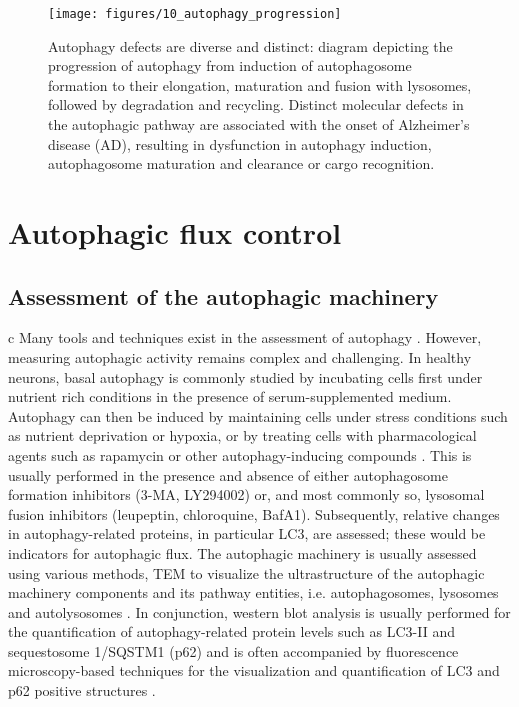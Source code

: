 \begin{figure}[!htbp]
  \texttt{[image: figures/10\_autophagy\_progression]}
  \caption{Autophagy defects are diverse and distinct: diagram depicting the progression of autophagy from induction of autophagosome formation to their elongation, maturation and fusion with lysosomes, followed by degradation and recycling. Distinct molecular defects in the autophagic pathway are associated with the onset of Alzheimer’s disease (AD), resulting in dysfunction in autophagy induction, autophagosome maturation and clearance or cargo recognition.}
  \label{fig:10_autophagy_progression}
\end{figure}

\section{Autophagic flux control}
\subsection{Assessment of the autophagic machinery}c
Many tools and techniques exist in the assessment of autophagy \citep{klionsky2016}. However, measuring autophagic activity remains complex and challenging. In healthy neurons, basal autophagy is commonly studied by incubating cells first under nutrient rich conditions in the presence of serum-supplemented medium. Autophagy can then be induced by maintaining cells under stress conditions such as nutrient deprivation \citep{Alirezaei2010} or hypoxia, or by treating cells with pharmacological agents such as rapamycin or other autophagy-inducing compounds \citep{Boland2008,Rose2010}. This is usually performed in the presence and absence of either autophagosome formation inhibitors (3-MA, LY294002) or, and most commonly so, lysosomal fusion inhibitors (leupeptin, chloroquine, BafA1). Subsequently, relative changes in autophagy-related proteins, in particular LC3, are assessed; these would be indicators for autophagic flux. The autophagic machinery is usually assessed using various methods, TEM to visualize the ultrastructure of the autophagic machinery components and its pathway entities, i.e. autophagosomes, lysosomes and autolysosomes \citep{klionsky2016}. In conjunction, western blot analysis is usually performed for the quantification of autophagy-related protein levels such as LC3-II and sequestosome 1/SQSTM1 (p62) and is often accompanied by fluorescence microscopy-based techniques for the visualization and quantification of LC3 and p62 positive structures \citep{klionsky2016,Klionsky2012,Mizushima2007,Swanlund2010}.

